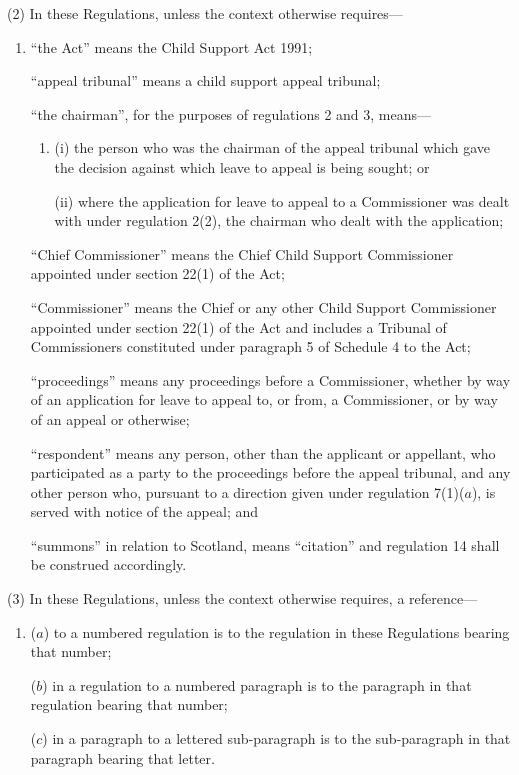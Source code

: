 \documentclass[a4paper]{article}
\begin{document}
(2) In these Regulations, unless the context otherwise requires—
\begin{enumerate}\item[]
“the Act” means the Child Support Act 1991;

“appeal tribunal” means a child support appeal tribunal;

“the chairman”, for the purposes of regulations 2 and 3, means—
\begin{enumerate}\item[]
(i) the person who was the chairman of the appeal tribunal which gave the decision against which leave to appeal is being sought; or

(ii) where the application for leave to appeal to a Commissioner was dealt with under regulation 2(2), the chairman who dealt with the application;
\end{enumerate}

“Chief Commissioner” means the Chief Child Support Commissioner appointed under section 22(1) of the Act;

“Commissioner” means the Chief or any other Child Support Commissioner appointed under section 22(1) of the Act and includes a Tribunal of Commissioners constituted under paragraph 5 of Schedule 4 to the Act;

“proceedings” means any proceedings before a Commissioner, whether by way of an application for leave to appeal to, or from, a Commissioner, or by way of an appeal or otherwise;

“respondent” means any person, other than the applicant or appellant, who participated as a party to the proceedings before the appeal tribunal, and any other person who, pursuant to a direction given under regulation 7(1)($a$), is served with notice of the appeal; and

“summons” in relation to Scotland, means “citation” and regulation 14 shall be construed accordingly.
\end{enumerate}

(3) In these Regulations, unless the context otherwise requires, a reference—
\begin{enumerate}\item[]
($a$) to a numbered regulation is to the regulation in these Regulations bearing that number;

($b$) in a regulation to a numbered paragraph is to the paragraph in that regulation bearing that number;

($c$) in a paragraph to a lettered sub-paragraph is to the sub-paragraph in that paragraph bearing that letter.
\end{enumerate}
\end{document}
